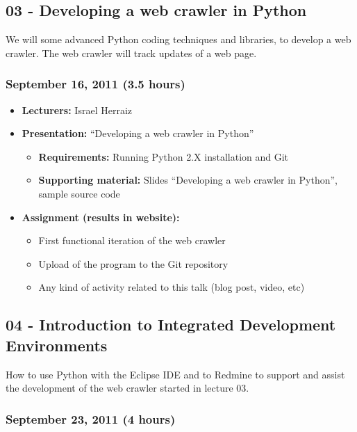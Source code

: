 \documentclass[a4paper]{article}
\begin{document}
\subsection{03 - Developing a web crawler in Python}

We will some advanced Python coding techniques and libraries, to
develop a web crawler. The web crawler  will track updates of a web
page.

\subsubsection{September 16, 2011 (3.5 hours)}

\begin{itemize}
\item \textbf{Lecturers:} Israel Herraiz
\item \textbf{Presentation:} ``Developing a web crawler in Python''
  \begin{itemize}
  \item \textbf{Requirements:} Running Python 2.X installation and Git
  \item \textbf{Supporting material:} Slides ``Developing a web
    crawler in Python'', sample source code
  \end{itemize}
\item \textbf{Assignment (results in website):} 
  \begin{itemize}
  \item First functional iteration of the web crawler
  \item Upload of the program to the Git repository
  \item Any kind of activity
    related to this talk (blog post, video, etc)
  \end{itemize}
\end{itemize}


\subsection{04 - Introduction to Integrated Development Environments}

How to use Python with the Eclipse IDE and to Redmine to support and
assist the development of the web crawler started in lecture 03.
\subsubsection{September 23, 2011 (4 hours)}
\end{document}

